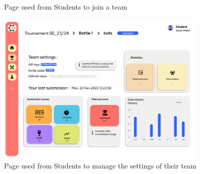 \begin{enumerate}[label=\textbf{F\arabic*)}]
\begin{figure}[H]
        \caption{Page used from Students to join a team}
    \end{figure}
    \begin{figure}[H]
        \centering
        \includegraphics[width=0.9\textwidth]{Mockups/15_student_team.png}
        \caption{Page used from Students to manage the settings of their team}
    \end{figure}
    

\end{enumerate}
